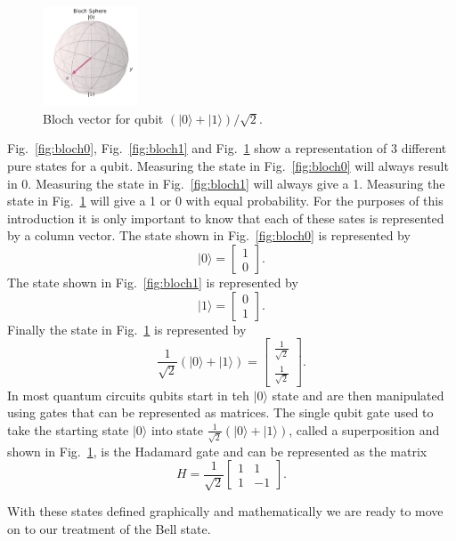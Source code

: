 \documentclass{article}
\newcommand{\ket}[1]{{\lvert #1 \rangle}}
\begin{document}
\begin{figure}[H]
    \centering
    \includegraphics[width=0.25\textwidth]{superpos.png}
    \caption{Bloch vector for qubit $(\ket{0}+\ket{1})/\sqrt{2}$.}
    \label{fig:blochplus}
\end{figure}

Fig.~\ref{fig:bloch0}, Fig.~\ref{fig:bloch1} and Fig.~\ref{fig:blochplus} show a representation of 3 different pure states for a qubit. Measuring the state in Fig.~\ref{fig:bloch0} will always result in 0. Measuring the state in Fig.~\ref{fig:bloch1} will always give a 1. Measuring the state in Fig.~\ref{fig:blochplus} will give a 1 or 0 with equal probability. For the purposes of this introduction it is only important to know that each of these sates is represented by a column vector. The state shown in Fig.~\ref{fig:bloch0} is represented by 
$$
\ket{0} = 
\begin{bmatrix}
1 \\
0
\end{bmatrix}.
$$
The state shown in Fig.~\ref{fig:bloch1} is represented by
$$
\ket{1} =
\begin{bmatrix}
0 \\
1
\end{bmatrix}.
$$
Finally the state in Fig.~\ref{fig:blochplus} is represented by
$$
\frac{1}{\sqrt{2}}(\ket{0}+\ket{1}) = 
\begin{bmatrix}
    \frac{1}{\sqrt{2}}\\
    \frac{1}{\sqrt{2}}
\end{bmatrix}.
$$
In most quantum circuits qubits start in teh $\ket{0}$ state and are then manipulated using gates that can be represented as matrices. The single qubit gate used to take the starting state $\ket{0}$ into state $\frac{1}{\sqrt{2}}(\ket{0}+\ket{1})$, called a superposition and shown in Fig.~\ref{fig:blochplus}, is the Hadamard gate and can be represented as the matrix
$$
H = \frac{1}{\sqrt{2}}
\begin{bmatrix}
    1 & 1 \\
    1 & -1
\end{bmatrix}.
$$

With these states defined graphically and mathematically we are ready to move on to our treatment of the Bell state. 
\end{document}
